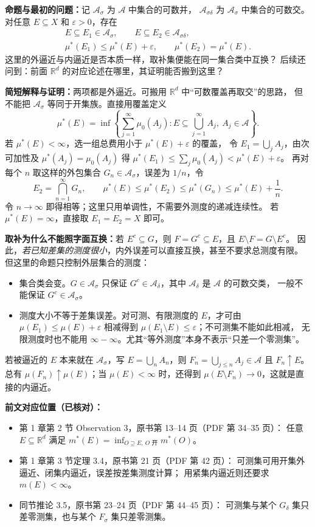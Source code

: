 \documentclass[UTF8,a4paper,11pt]{ctexart}
\begin{document}
\textbf{命题与最初的问题：}记 $\mathcal A_\sigma$ 为 $\mathcal A$ 中集合的可数并，
$\mathcal A_{\sigma\delta}$ 为 $\mathcal A_\sigma$ 中集合的可数交。
对任意 $E\subseteq X$ 和 $\varepsilon>0$，存在
\[
\begin{gathered}
E\subseteq E_1\in\mathcal A_\sigma,\qquad
E\subseteq E_2\in\mathcal A_{\sigma\delta},\\
\mu^*(E_1)\leq\mu^*(E)+\varepsilon,\qquad
\mu^*(E_2)=\mu^*(E).
\end{gathered}
\]
这里的外逼近与内逼近是否本质一样，取补集便能在同一集合类中互换？
后续还问到：前面 $\mathbb R^d$ 的对应论述在哪里，其证明能否搬到这里？

\textbf{简短解释与证明：}两项都是外逼近。可搬用 $\mathbb R^d$ 中“可数覆盖再取交”的思路，
但不能把 $\mathcal A_\sigma$ 等同于开集族。直接用覆盖定义
\[
\mu^*(E)=\inf\left\{\sum_{j=1}^{\infty}\mu_0(A_j):
E\subseteq\bigcup_{j=1}^{\infty}A_j,\ A_j\in\mathcal A\right\}.
\]
若 $\mu^*(E)<\infty$，选一组总费用小于 $\mu^*(E)+\varepsilon$ 的覆盖，
令 $E_1=\bigcup_jA_j$，由次可加性及 $\mu^*(A_j)=\mu_0(A_j)$ 得
$\mu^*(E_1)\leq\sum_j\mu_0(A_j)<\mu^*(E)+\varepsilon$。
再对每个 $n$ 取这样的外包集合 $G_n\in\mathcal A_\sigma$，误差为 $1/n$，令
\[
E_2=\bigcap_{n=1}^{\infty}G_n,\qquad
\mu^*(E)\leq\mu^*(E_2)\leq\mu^*(G_n)\leq\mu^*(E)+\frac1n.
\]
令 $n\to\infty$ 即得相等；这里只用单调性，不需要外测度的递减连续性。
若 $\mu^*(E)=\infty$，直接取 $E_1=E_2=X$ 即可。

\textbf{取补为什么不能照字面互换：}若 $E^c\subseteq G$，则
$F=G^c\subseteq E$，且 $E\setminus F=G\setminus E^c$。
因此，\emph{若已知差集的测度很小}，内外误差可以直接互换，甚至不要求总测度有限。
但这里的命题只控制外层集合的测度：
\begin{itemize}
\item 集合类会变。$G\in\mathcal A_\sigma$ 只保证
$G^c\in\mathcal A_\delta$，其中 $\mathcal A_\delta$ 是 $\mathcal A$ 的可数交类，
一般不能保证 $G^c\in\mathcal A_\sigma$。
\item 测度大小不等于差集误差。对可测、有限测度的 $E$，才可由
$\mu(E_1)\leq\mu(E)+\varepsilon$ 相减得到
$\mu(E_1\setminus E)\leq\varepsilon$；不可测集不能如此相减，
无限测度时也不能用 $\infty-\infty$。尤其“等外测度”本身不表示“只差一个零测集”。
\end{itemize}
若被逼近的 $E$ 本来就在 $\mathcal A_\sigma$，写
$E=\bigcup_nA_n$，则 $F_n=\bigcup_{j\leq n}A_j\in\mathcal A$ 且 $F_n\uparrow E$。
总有 $\mu(F_n)\uparrow\mu(E)$；当 $\mu(E)<\infty$ 时，还得到
$\mu(E\setminus F_n)\to0$，这就是直接的内逼近。

\textbf{前文对应位置（已核对）：}
\begin{itemize}
\item 第 1 章第 2 节 Observation 3，原书第 13--14 页（PDF 第 34--35 页）：
任意 $E\subseteq\mathbb R^d$ 满足
$m^*(E)=\inf_{O\supseteq E,\ O\text{ 开}}m^*(O)$。
\item 第 1 章第 3 节定理 3.4，原书第 21 页（PDF 第 42 页）：
可测集可用开集外逼近、闭集内逼近，误差按差集测度计算；
用紧集内逼近则还要求 $m(E)<\infty$。
\item 同节推论 3.5，原书第 23--24 页（PDF 第 44--45 页）：
可测集与某个 $G_\delta$ 集只差零测集，也与某个 $F_\sigma$ 集只差零测集。
\end{itemize}
\end{document}

